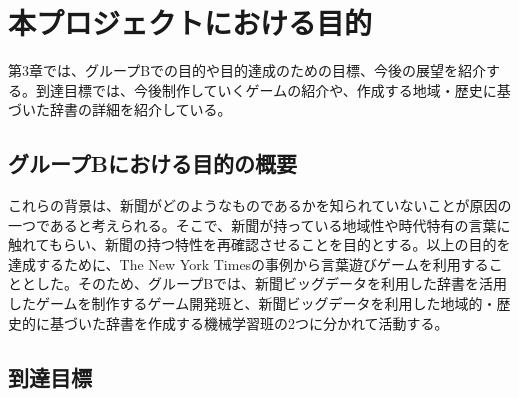\chapter{本プロジェクトにおける目的}
第3章では、グループBでの目的や目的達成のための目標、今後の展望を紹介する。到達目標では、今後制作していくゲームの紹介や、作成する地域・歴史に基づいた辞書の詳細を紹介している。
\section{グループBにおける目的の概要}
これらの背景は、新聞がどのようなものであるかを知られていないことが原因の一つであると考えられる。そこで、新聞が持っている地域性や時代特有の言葉に触れてもらい、新聞の持つ特性を再確認させることを目的とする。以上の目的を達成するために、The New York Timesの事例から言葉遊びゲームを利用することとした。そのため、グループBでは、新聞ビッグデータを利用した辞書を活用したゲームを制作するゲーム開発班と、新聞ビッグデータを利用した地域的・歴史的に基づいた辞書を作成する機械学習班の2つに分かれて活動する。

\section{到達目標}

